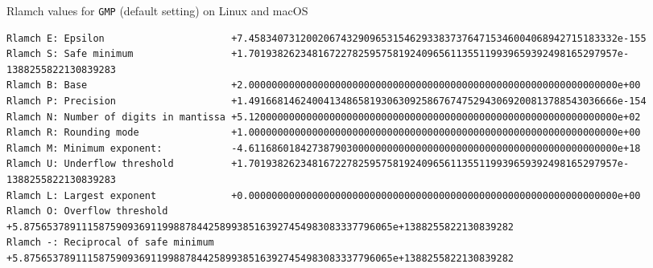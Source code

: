 \documentclass[12pt]{article}
\begin{document}
\begin{table}
\caption{Rlamch values for {\tt GMP} (default setting) on Linux and macOS}\label{rlamchgmp}
\begin{center}
\scriptsize
{
\begin{verbatim}
Rlamch E: Epsilon                      +7.4583407312002067432909653154629338373764715346004068942715183332e-155
Rlamch S: Safe minimum                 +1.7019382623481672278259575819240965611355119939659392498165297957e-1388255822130839283
Rlamch B: Base                         +2.0000000000000000000000000000000000000000000000000000000000000000e+00
Rlamch P: Precision                    +1.4916681462400413486581930630925867674752943069200813788543036666e-154
Rlamch N: Number of digits in mantissa +5.1200000000000000000000000000000000000000000000000000000000000000e+02
Rlamch R: Rounding mode                +1.0000000000000000000000000000000000000000000000000000000000000000e+00
Rlamch M: Minimum exponent:            -4.6116860184273879030000000000000000000000000000000000000000000000e+18
Rlamch U: Underflow threshold          +1.7019382623481672278259575819240965611355119939659392498165297957e-1388255822130839283
Rlamch L: Largest exponent             +0.0000000000000000000000000000000000000000000000000000000000000000e+00
Rlamch O: Overflow threshold           +5.8756537891115875909369119988784425899385163927454983083337796065e+1388255822130839282
Rlamch -: Reciprocal of safe minimum   +5.8756537891115875909369119988784425899385163927454983083337796065e+1388255822130839282
\end{verbatim}
}
\end{center}
\end{table}
\end{document}
